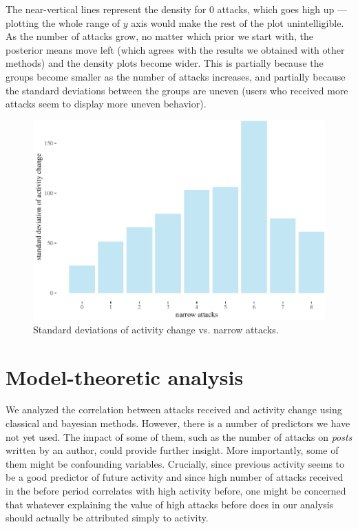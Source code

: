 \documentclass[10pt,]{scrartcl}
\begin{document}
\normalsize

The near-vertical lines represent the density for 0 attacks, which goes
high up --- plotting the whole range of \(y\) axis would make the rest
of the plot unintelligible. As the number of attacks grow, no matter
which prior we start with, the posterior means move left (which agrees
with the results we obtained with other methods) and the density plots
become wider. This is partially because the groups become smaller as the
number of attacks increases, and partially because the standard
deviations between the groups are uneven (users who received more
attacks seem to display more uneven behavior).

\begin{figure}[!ht]

\begin{center}\includegraphics[width=1\linewidth]{redditAnalysisWalkthrough_files/figure-latex/unnamed-chunk-60-1} \end{center}
\caption{Standard deviations of  activity change vs. narrow attacks.}
\label{fig:bayesian3'}
\end{figure}

\section{Model-theoretic analysis}

\normalsize

We analyzed the correlation between attacks received and activity change
using classical and bayesian methods. However, there is a number of
predictors we have not yet used. The impact of some of them, such as the
number of attacks on \emph{posts} written by an author, could provide
further insight. More importantly, some of them might be confounding
variables. Crucially, since previous activity seems to be a good
predictor of future activity and since high number of attacks received
in the \textsf{before} period correlates with high activity before, one
might be concerned that whatever explaining the value of high attacks
before does in our analysis should actually be attributed simply to
activity.
\end{document}
